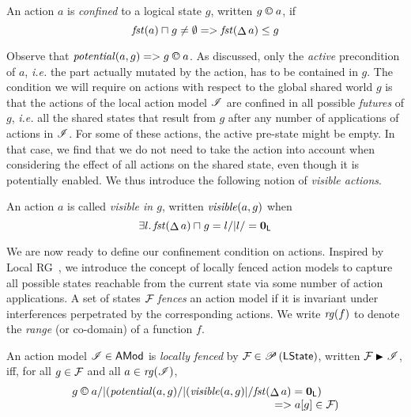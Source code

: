 \begin{definition}
  \label{def:actconf}
  An action $a$ is \emph{confined} to a logical state $g$, written
  $g\containI a$, if
  \vspace{-1ex}
  \[
  \vspace{-1ex}
  \m{fst}(a)\meetL g \neq\emptyset => \m{fst}(\updateFP{a})\leq g
  \]
\end{definition}

Observe that $\m{potential}(a,g) => g\containI a$.  As discussed, only
the \emph{active} precondition of $a$, \textit{i.e.}  the part
actually mutated by the action, has to be contained in $g$.  The
condition we will require on actions with respect to the global shared
world $g$ is that the actions of the local action model $\mathscr{I}$ are
confined in all possible \emph{futures} of $g$, \textit{i.e.} all the
shared states that result from $g$ after any number of applications of
actions in $\mathscr{I}$. For some of these actions, the active pre-state
might be empty. In that case, we find that we do not need to take the
action into account when considering the effect of all actions on the
shared state, even though it is potentially enabled. We thus introduce
the following notion of \emph{visible actions}.

\begin{definition}
  An action $a$ is called \emph{visible in $g$}, written
  $\mathit{visible}(a,g)$ when
  \vspace{-1ex}
  \[
  \vspace{-1ex}
  \E{l} \m{fst}(\updateFP{a})\meetL g = l /| l/=\unitL
  \]
\end{definition}


We are now ready to define our confinement condition on actions.
Inspired by Local RG~\cite{lrg}, we introduce the concept of
locally fenced action models to capture all possible states reachable
from the current state via some number of action applications. A set
of states $\mathcal{F}_{}$ \emph{fences} an action model if it is invariant
under interferences perpetrated by the corresponding actions. We write
$\mathit{rg}(f)$ to denote the \emph{range} (or co-domain) of a function
$f$.

\begin{definition}\label{def:localFence}
  An action model $\mathscr{I} \in \textsf{AMod}$ is \emph{locally fenced} by
  $\mathcal{F}_{} \in \mathscr{P}\left(\textsf{LState} \right)$, written $\fence{} \strictfences \lmod$,
  iff, for all $g \in \mathcal{F}_{}$ and all $a\in\mathit{rg}(\mathscr{I})$,
  \vspace{-1ex}
\[
  \vspace{-1ex}
\begin{array}{@{} l @{\hspace*{-1.5cm}} l @{}}
  g\containI a /|
  (\m{potential}(a,g) /| (\m{visible}(a,g) |/ \m{fst}(\updateFP{a}) = \unitL) & \\
  & => a[g]\in\fence{})
\end{array}
\]
\end{definition}

